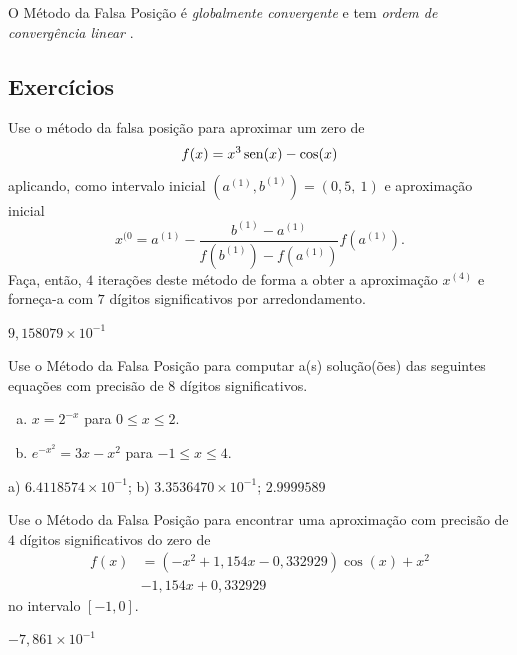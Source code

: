 \begin{obs}
  O Método da Falsa Posição é \emph{globalmente convergente} e tem \emph{ordem de convergência linear} \cite[Seção 8.3]{Ralston2001a}.
\end{obs}

\subsection{Exercícios}

\begin{exer}
  Use o método da falsa posição para aproximar um zero de
  \begin{equation}
    f(x) = x^3\operatorname{sen}(x)-\cos(x)
  \end{equation}
  aplicando, como intervalo inicial $(a^{(1)}, b^{(1)}) = (0,5, ~1)$ e aproximação inicial
  \begin{equation}
    x^{(0} = a^{(1)} - \frac{b^{(1)}-a^{(1)}}{f(b^{(1)})-f(a^{(1)})}f(a^{(1)}).
  \end{equation}
  Faça, então, $4$ iterações deste método de forma a obter a aproximação $x^{(4)}$ e forneça-a com $7$ dígitos significativos por arredondamento.
\end{exer}
\begin{resp}
  $9,158079\times 10^{-1}$
\end{resp}

\begin{exer}
  Use o Método da Falsa Posição para computar a(s) solução(ões) das seguintes equações com precisão de 8 dígitos significativos.
  \begin{enumerate}[a)]
  \item $x = 2^{-x}$ para $0\leq x \leq 2$.
  \item $e^{-x^2} = 3x - x^2$ para $-1\leq x\leq 4$.
  \end{enumerate}
\end{exer}
\begin{resp}
  a) $6.4118574\times 10^{-1}$; b) $3.3536470\times 10^{-1}$; $2.9999589$
\end{resp}

\begin{exer}
  Use o Método da Falsa Posição para encontrar uma aproximação com precisão de $4$ dígitos significativos do zero de 
  \begin{equation}
    \begin{aligned}
      f(x) &= (-x^2+1,154x-0,332929)\cos(x) + x^2 \\
           &- 1,154x + 0,332929
    \end{aligned}
\end{equation}
  no intervalo $[-1, 0]$.
\end{exer}
\begin{resp}
  $-7,861\times 10^{-1}$
\end{resp}

